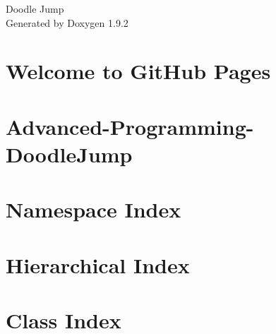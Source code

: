 \documentclass[twoside]{book}
\newcommand{\+}{\discretionary{\mbox{\scriptsize$\hookleftarrow$}}{}{}}
\newcommand{\clearemptydoublepage}{%
    \newpage{\pagestyle{empty}\cleardoublepage}%
  }
\begin{document}
  \raggedbottom
    \hypersetup{pageanchor=false,
                bookmarksnumbered=true,
                pdfencoding=unicode
               }
  \begin{titlepage}
  \vspace*{7cm}
  \begin{center}%
  {\Large Doodle Jump}\\
  \vspace*{1cm}
  {\large Generated by Doxygen 1.9.2}\\
  \end{center}
  \end{titlepage}
  \clearemptydoublepage
  \tableofcontents
  \clearemptydoublepage
  \hypersetup{pageanchor=true}
\chapter{Welcome to Git\+Hub Pages}
\label{md___users_pablodeputter__documents__git_hub__advanced__programming__doodle_jump_docs_index}

\chapter{Advanced-\/\+Programming-\/\+Doodle\+Jump}
\label{md___users_pablodeputter__documents__git_hub__advanced__programming__doodle_jump__r_e_a_d_m_e}

\chapter{Namespace Index}

\chapter{Hierarchical Index}

\chapter{Class Index}

\end{document}
